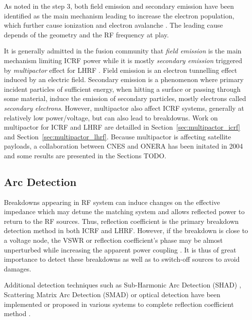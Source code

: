 As noted in the step 3, both field emission and secondary emission have been identified as the main mechanism leading to increase the electron population, which further cause ionization and electron avalanche . The leading cause depends of the geometry and the RF frequency at play. 

It is generally admitted in the fusion community that \textit{field emission} is the main mechanism limiting ICRF power while it is mostly  \textit{secondary emission} triggered by \textit{multipactor} effect for LHRF . Field emission is an electron tunnelling effect induced by an electric field. Secondary emission is a phenomenon where primary incident particles of sufficient energy, when hitting a surface or passing through some material, induce the emission of secondary particles, mostly electrons called \textit{secondary electrons}. However, multipactor also affect ICRF systems, generally at relatively low power/voltage, but can also lead to breakdowns. Work on multipactor for ICRF and LHRF are detailled in Section~\ref{sec:multipactor_icrf} and Section~\ref{sec:multipactor_lhrf}. Because multipactor is affecting satellite payloads, a collaboration between CNES and ONERA has been initated in 2004 and some results are presented in the Sections TODO.



\subsection{Arc Detection}
Breakdowns appearing in RF system can induce changes on the effective impedance which may detune the matching system and allows reflected power to return to the RF sources. Thus, reflection coefficient is the primary breakdown detection method in both ICRF and LHRF. However, if the breakdown is close to a voltage node, the VSWR or reflection coefficient’s phase may be almost unperturbed while increasing the apparent power coupling . It is thus of great importance to detect these breakdowns as well as to switch-off sources to avoid damages. 

Additional detection techniques such as Sub-Harmonic Arc Detection (SHAD) , Scattering Matrix Arc Detection (SMAD)  or optical detection have been implemented or proposed in various systems to complete reflection coefficient method . 



